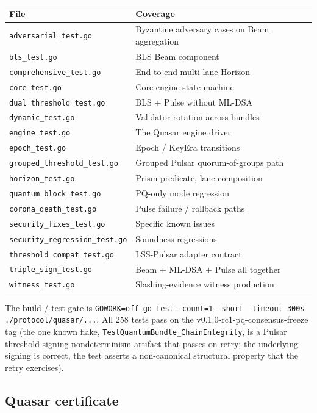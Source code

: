 \begin{tabular}{@{}p{}p{}@{}}
  \toprule
  \textbf{File} & \textbf{Coverage} \\
  \midrule
  \texttt{adversarial\_test.go} & Byzantine adversary cases on Beam aggregation \\
  \texttt{bls\_test.go} & BLS Beam component \\
  \texttt{comprehensive\_test.go} & End-to-end multi-lane Horizon \\
  \texttt{core\_test.go} & Core engine state machine \\
  \texttt{dual\_threshold\_test.go} & BLS + Pulse without ML-DSA \\
  \texttt{dynamic\_test.go} & Validator rotation across bundles \\
  \texttt{engine\_test.go} & The Quasar engine driver \\
  \texttt{epoch\_test.go} & Epoch / KeyEra transitions \\
  \texttt{grouped\_threshold\_test.go} & Grouped Pulsar quorum-of-groups path \\
  \texttt{horizon\_test.go} & Prism predicate, lane composition \\
  \texttt{quantum\_block\_test.go} & PQ-only mode regression \\
  \texttt{corona\_death\_test.go} & Pulse failure / rollback paths \\
  \texttt{security\_fixes\_test.go} & Specific known issues \\
  \texttt{security\_regression\_test.go} & Soundness regressions \\
  \texttt{threshold\_compat\_test.go} & LSS-Pulsar adapter contract \\
  \texttt{triple\_sign\_test.go} & Beam + ML-DSA + Pulse all together \\
  \texttt{witness\_test.go} & Slashing-evidence witness production \\
  \bottomrule
\end{tabular}

The build / test gate is \texttt{GOWORK=off go test -count=1 -short -timeout 300s ./protocol/quasar/...}. All 258 tests pass on the v0.1.0-rc1-pq-consensus-freeze tag (the one known flake, \texttt{TestQuantumBundle\_ChainIntegrity}, is a Pulsar threshold-signing nondeterminism artifact that passes on retry; the underlying signing is correct, the test asserts a non-canonical structural property that the retry exercises).

\subsection{Quasar certificate}


